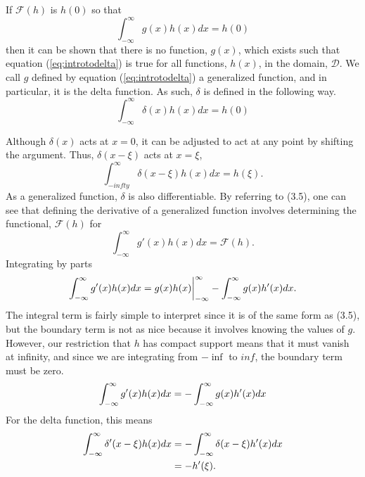 If \(\mathcal{F}(h)\) is \(h(0)\) so that
\begin{equation}\label{eq:introtodelta}
    \int_{-\infty}^{\infty}g(x)h(x) dx=h(0)
\end{equation}
then it can be shown that there is no function, \(g(x)\), which exists such that equation (\ref{eq:introtodelta}) is true for all functions, \(h(x)\), in the domain, \(\mathcal{D}\). We call \(g\) defined by equation (\ref{eq:introtodelta}) a generalized function, and in particular, it is the delta function. As such, \(\delta\) is defined in the following way.
\begin{equation}
    \int_{-\infty}^{\infty} \delta(x)h(x) dx = h(0)
\end{equation}

Although \(\delta(x)\) acts at \(x=0\), it can be adjusted to act at any point by shifting the argument. Thus, \(\delta(x-\xi)\) acts at \(x=\xi\),
\begin{equation}
    \int_{-infty}^{\infty} \delta(x-\xi)h(x)dx = h(\xi).
\end{equation}
As a generalized function, \(\delta\) is also differentiable. By referring to (3.5), one can see that defining the derivative of a generalized function involves determining the functional, \(\mathcal{F}(h)\) for
\begin{equation}
    \int_{-\infty}^{\infty} g'(x)h(x) dx= \mathcal{F}(h).
\end{equation}
Integrating by parts
\begin{equation}
    \int_{-\infty}^{\infty} g'(x)h(x)dx = g(x)h(x)\biggr\rvert_{-\infty}^{\infty} - \int_{-\infty}^{\infty} g(x)h'(x)dx.
\end{equation}
The integral term is fairly simple to interpret since it is of the same form as (3.5), but the boundary term is not as nice because it involves knowing the values of \(g\). However, our restriction that \(h\) has compact support means that it must vanish at infinity, and since we are integrating from \(-\inf\) to \(inf\), the boundary term must be zero.
\begin{equation}
    \int_{-\infty}^{\infty} g'(x)h(x)dx = -\int_{-\infty}^{\infty} g(x)h'(x)dx
\end{equation}
For the delta function, this means
\begin{equation}
    \begin{split} \label{eq:deltafirst}
        \int_{-\infty}^{\infty} \delta'(x-\xi)h(x)dx &= -\int_{-\infty}^{\infty}\delta(x-\xi)h'(x)dx\\
        &=-h'(\xi).
    \end{split}
\end{equation}


